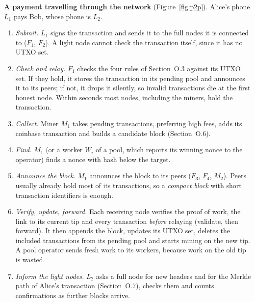 \documentclass[11pt,a4paper]{article}
\theoremstyle{definition}
\theoremstyle{plain}
\theoremstyle{remark}
\begin{document}
\textbf{A payment travelling through the network} (Figure~\ref{fig:p2p}). Alice's phone $L_1$ pays Bob, whose phone is $L_2$.
\begin{enumerate}[nosep,leftmargin=1.5em]
\item \emph{Submit.} $L_1$ signs the transaction and sends it to the full nodes it is connected to ($F_1$, $F_2$). A light node cannot check the transaction itself, since it has no UTXO set.
\item \emph{Check and relay.} $F_1$ checks the four rules of Section~O.3 against its UTXO set. If they hold, it stores the transaction in its pending pool and announces it to its peers; if not, it drops it silently, so invalid transactions die at the first honest node. Within seconds most nodes, including the miners, hold the transaction.
\item \emph{Collect.} Miner $M_1$ takes pending transactions, preferring high fees, adds its coinbase transaction and builds a candidate block (Section~O.6).
\item \emph{Find.} $M_1$ (or a worker $W_i$ of a pool, which reports its winning nonce to the operator) finds a nonce with hash below the target.
\item \emph{Announce the block.} $M_1$ announces the block to its peers ($F_3$, $F_4$, $M_2$). Peers usually already hold most of its transactions, so a \emph{compact block} with short transaction identifiers is enough.
\item \emph{Verify, update, forward.} Each receiving node verifies the proof of work, the link to its current tip and every transaction \emph{before} relaying (validate, then forward). It then appends the block, updates its UTXO set, deletes the included transactions from its pending pool and starts mining on the new tip. A pool operator sends fresh work to its workers, because work on the old tip is wasted.
\item \emph{Inform the light nodes.} $L_2$ asks a full node for new headers and for the Merkle path of Alice's transaction (Section~O.7), checks them and counts confirmations as further blocks arrive.
\end{enumerate}
\end{document}
